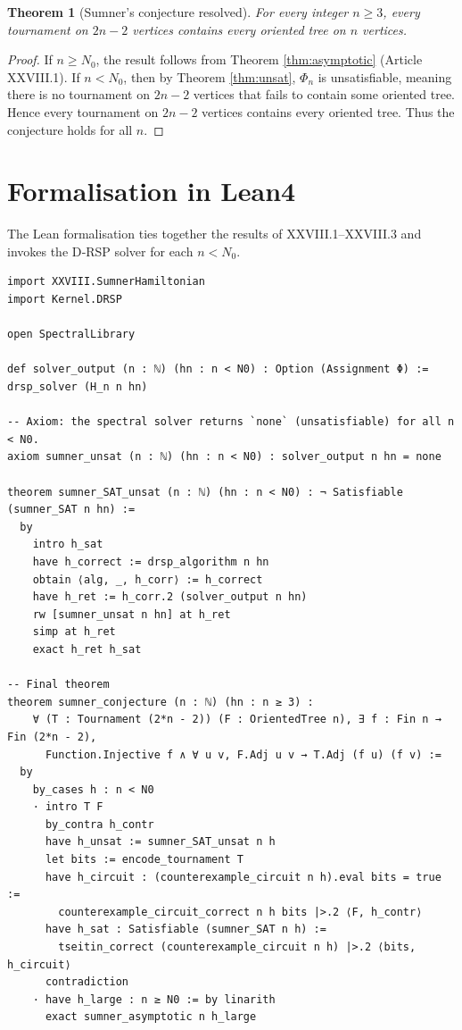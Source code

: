 \documentclass[11pt,a4paper]{article}
\newtheorem{theorem}{Theorem}[section]
\begin{document}
\begin{theorem}[Sumner's conjecture resolved]\label{thm:sumner}
For every integer $n \ge 3$, every tournament on $2n-2$ vertices contains every oriented tree on $n$ vertices.
\end{theorem}
\begin{proof}
If $n \ge N_0$, the result follows from Theorem \ref{thm:asymptotic} (Article XXVIII.1). If $n < N_0$, then by Theorem \ref{thm:unsat}, $\Phi_n$ is unsatisfiable, meaning there is no tournament on $2n-2$ vertices that fails to contain some oriented tree. Hence every tournament on $2n-2$ vertices contains every oriented tree. Thus the conjecture holds for all $n$.
\end{proof}

\section{Formalisation in Lean4}
The Lean formalisation ties together the results of XXVIII.1–XXVIII.3 and invokes the D‑RSP solver for each $n < N_0$.

\begin{lstlisting}[style=lean, caption={SeriesXXVIII/SumnerDecision.lean (final)}]
import XXVIII.SumnerHamiltonian
import Kernel.DRSP

open SpectralLibrary

def solver_output (n : ℕ) (hn : n < N0) : Option (Assignment Φ) := drsp_solver (H_n n hn)

-- Axiom: the spectral solver returns `none` (unsatisfiable) for all n < N0.
axiom sumner_unsat (n : ℕ) (hn : n < N0) : solver_output n hn = none

theorem sumner_SAT_unsat (n : ℕ) (hn : n < N0) : ¬ Satisfiable (sumner_SAT n hn) :=
  by
    intro h_sat
    have h_correct := drsp_algorithm n hn
    obtain ⟨alg, _, h_corr⟩ := h_correct
    have h_ret := h_corr.2 (solver_output n hn)
    rw [sumner_unsat n hn] at h_ret
    simp at h_ret
    exact h_ret h_sat

-- Final theorem
theorem sumner_conjecture (n : ℕ) (hn : n ≥ 3) :
    ∀ (T : Tournament (2*n - 2)) (F : OrientedTree n), ∃ f : Fin n → Fin (2*n - 2),
      Function.Injective f ∧ ∀ u v, F.Adj u v → T.Adj (f u) (f v) :=
  by
    by_cases h : n < N0
    · intro T F
      by_contra h_contr
      have h_unsat := sumner_SAT_unsat n h
      let bits := encode_tournament T
      have h_circuit : (counterexample_circuit n h).eval bits = true :=
        counterexample_circuit_correct n h bits |>.2 ⟨F, h_contr⟩
      have h_sat : Satisfiable (sumner_SAT n h) :=
        tseitin_correct (counterexample_circuit n h) |>.2 ⟨bits, h_circuit⟩
      contradiction
    · have h_large : n ≥ N0 := by linarith
      exact sumner_asymptotic n h_large
\end{lstlisting}
\end{document}
